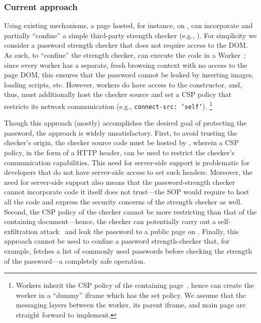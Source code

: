 \subsubsection{Current approach}
%
Using existing mechanisms, a page hosted, for instance, on
, can incorporate and partially ``confine'' a
simple third-party strength checker (e.g.,
).
%
For simplicity we consider a password strength checker that does not
require access to the DOM.
%
As such, to ``confine'' the strength checker, 
can execute the code in a Worker~;
%
since every worker has a separate, fresh browsing context with no
access to the page DOM, this ensures that the password cannot be
leaked by inserting images, loading scripts, etc.
%
However, workers do have access to the \xhr{} constructor, and, thus,
 must additionally host the checker source and set
a CSP policy that restricts its network communication (e.g.,
\texttt{connect-src: 'self'}).
\footnote{
  Workers inherit the CSP policy of the containing page~,
  hence  can create the worker in a ``dummy''
  iframe which has the set policy.
  We assume that the messaging layers between the worker, its parent
  iframe, and main page are straight forward to implement.
}
%

Though this approach (mostly) accomplishes the desired goal of
protecting the password, the approach is widely unsatisfactory.
%
First, to avoid trusting the checker's origin, the checker source code
must be hosted by , wherein a CSP policy, in the
form of a HTTP  header, can be used to restrict the checker's
communication capabilities. 
%
This need for server-side support is problematic for developers that
do not have server-side access to set such headers.
%
Moreover, the need for server-side support also means that the
password-strength checker cannot incorporate code it itself does not
trust---the SOP would require  to host all the code
and express the security concerns of the strength checker as well.
%
Second, the CSP policy of the checker cannot be more restricting than
that of the containing document---hence, the checker can potentially
carry out a self-exfiltration attack~ and
leak the password to a public page on .
%
Finally, this approach cannot be used to confine a password
strength-checker that, for example, fetches a list of commonly used
passwords before checking the strength of the password---a completely
safe operation.
%

